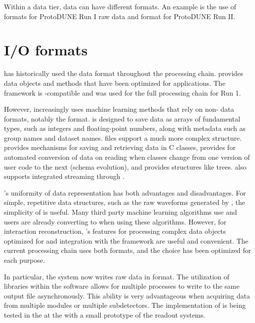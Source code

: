 \documentclass[../main-v1.tex]{subfiles}
\begin{document}
Within a data tier, data can have different formats.  An example is the use of  formats for ProtoDUNE Run I raw data and  format for ProtoDUNE Run II.

\section{I/O formats }
 has historically used the  data format throughout the processing chain.   provides data objects and methods that have been optimized for  applications.  The  framework is -compatible and  was used for the full processing chain for  Run 1. 

However,  increasingly uses   machine learning methods that rely on non- data formats, notably the  format.   is designed to save data as arrays of fundamental types, such as integers and floating-point numbers, along with metadata such as group names and dataset names.   files support a much more complex structure.   provides mechanisms for saving and retrieving data in C\raisebox{1pt}{++} classes, provides for automated conversion of data on reading when classes change from one version of user code to the next (schema evolution), and provides structures like trees.  also supports integrated streaming through . 

's uniformity of data representation has both advantages and disadvantages. For simple, repetitive data structures, such as the raw waveforms generated by , the simplicity of  is useful.  Many third party machine learning algorithms use  and users are already converting  to  when using these algorithms.  However, for interaction reconstruction, 's features for processing complex data objects optimized for  and integration with the  framework are useful and convenient.  The current  processing chain uses both formats, and the choice has been optimized for each purpose.

In particular, the   system now writes raw data in  format. The utilization of  libraries within the  software allows for multiple processes to write to the same output file asynchronously. This ability is very advantageous when acquiring data from multiple  modules or multiple  subdetectors. The implementation of  is being tested %
in the  \coldbox at the  with a small prototype of the %
  readout systems. 
\end{document}
